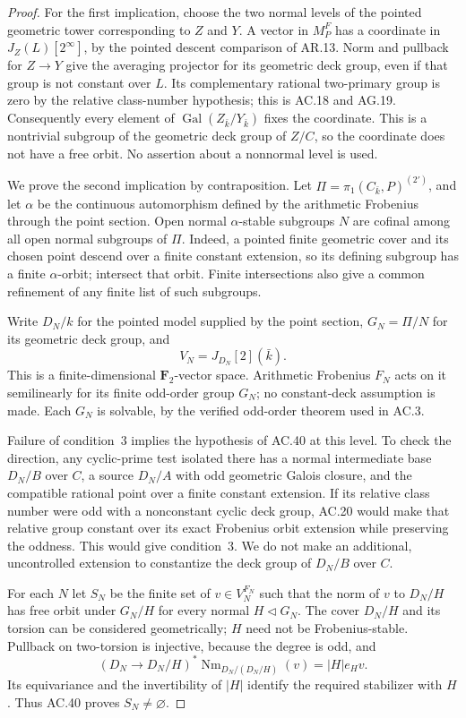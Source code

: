 \begin{proof}
For the first implication, choose the two normal levels of the
pointed geometric tower corresponding to $Z$ and $Y$. A vector
in $M_P^F$ has a coordinate in $J_Z(L)[2^\infty]$, by the
pointed descent comparison of AR.13. Norm and pullback for
$Z\to Y$ give the averaging projector for its geometric deck
group, even if that group is not constant over $L$. Its
complementary rational two-primary group is zero by the
relative class-number hypothesis; this is AC.18 and AG.19.
Consequently every element of $\operatorname{Gal}(Z_{\bar k}/Y_{\bar k})$
fixes the coordinate. This is a nontrivial subgroup of the
geometric deck group of $Z/C$, so the coordinate does not have
a free orbit. No assertion about a nonnormal level is used.

We prove the second implication by contraposition. Let
$\Pi=\pi_1(C_{\bar k},P)^{(2')}$, and let $\alpha$ be the
continuous automorphism defined by the arithmetic Frobenius
through the point section. Open normal $\alpha$-stable subgroups
$N$ are cofinal among all open normal subgroups of $\Pi$.
Indeed, a pointed finite geometric cover and its chosen point
descend over a finite constant extension, so its defining
subgroup has a finite $\alpha$-orbit; intersect that orbit.
Finite intersections also give a common refinement of any
finite list of such subgroups.

Write $D_N/k$ for the pointed model supplied by the point
section, $G_N=\Pi/N$ for its geometric deck group, and
\[
                  V_N=J_{D_N}[2](\bar k).
\]
This is a finite-dimensional $\mathbf F_2$-vector space.
Arithmetic Frobenius $F_N$ acts on it semilinearly for its
finite odd-order group $G_N$; no constant-deck assumption is
made. Each $G_N$ is solvable, by the verified odd-order theorem
used in AC.3.

Failure of condition~3 implies the hypothesis of AC.40 at this
level. To check the direction, any cyclic-prime test isolated
there has a normal intermediate base $D_N/B$ over $C$, a
source $D_N/A$ with odd geometric Galois closure, and the
compatible rational point over a finite constant extension.
If its relative class number were odd with a nonconstant
cyclic deck group, AC.20 would make that relative group constant
over its exact Frobenius orbit extension while preserving the
oddness. This would give condition~3. We do not make an
additional, uncontrolled extension to constantize the deck
group of $D_N/B$ over $C$.

For each $N$ let $S_N$ be the finite set of $v\in V_N^{F_N}$
such that the norm of $v$ to $D_N/H$ has free orbit under
$G_N/H$ for every normal $H\triangleleft G_N$. The cover
$D_N/H$ and its torsion can be considered geometrically;
$H$ need not be Frobenius-stable. Pullback on two-torsion is
injective, because the degree is odd, and
\[
 (D_N\to D_N/H)^*\operatorname{Nm}_{D_N/(D_N/H)}(v)
                         =|H|e_Hv.
\]
Its equivariance and the invertibility of $|H|$ identify the
required stabilizer with $H$. Thus AC.40 proves $S_N\ne\varnothing$.


\end{proof}
